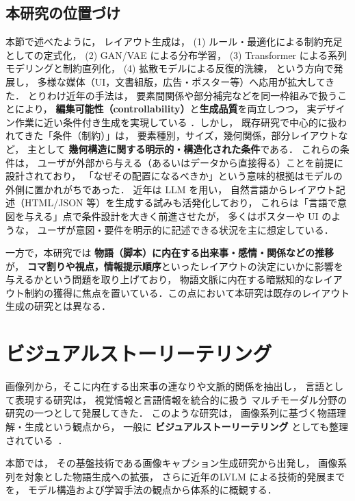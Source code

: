 \documentclass[a4j,12pt,dvipdfmx]{jsreport}
\begin{document}
\subsection{本研究の位置づけ}
\label{sec:layout_positioning}

本節で述べたように，
レイアウト生成は，
(1) ルール・最適化による制約充足としての定式化，
(2) GAN/VAE による分布学習，
(3) Transformer による系列モデリングと制約直列化，
(4) 拡散モデルによる反復的洗練，
という方向で発展し，
多様な媒体（UI，文書組版，広告・ポスター等）へ応用が拡大してきた．
とりわけ近年の手法は，
要素間関係や部分補完などを同一枠組みで扱うことにより，
\textbf{編集可能性（controllability）}と\textbf{生成品質}を両立しつつ，
実デザイン作業に近い条件付き生成を実現している
\cite{jiang_layoutformer_2023,inoue_layoutdm_2023,lin_layoutprompter_2023}．しかし，
既存研究で中心的に扱われてきた「条件（制約）」は，
要素種別，サイズ，幾何関係，部分レイアウトなど，
主として \textbf{幾何構造に関する明示的・構造化された条件}である．
これらの条件は，
ユーザが外部から与える（あるいはデータから直接得る）ことを前提に設計されており，
「なぜその配置になるべきか」という意味的根拠はモデルの外側に置かれがちであった．
近年は LLM を用い，
自然言語からレイアウト記述（HTML/JSON 等）を生成する試みも活発化しており，
これらは「言語で意図を与える」点で条件設計を大きく前進させたが，
多くはポスターや UI のような，
ユーザが意図・要件を明示的に記述できる状況を主に想定している．

一方で，本研究では
\textbf{物語（脚本）に内在する出来事・感情・関係などの推移}が，
\textbf{コマ割りや視点，情報提示順序}といったレイアウトの決定にいかに影響を与えるかという問題を取り上げており，
物語文脈に内在する暗黙知的なレイアウト制約の獲得に焦点を置いている．この点において本研究は既存のレイアウト生成の研究とは異なる．

\section{ビジュアルストーリーテリング}
\label{sec:visual_storytelling}

画像列から，そこに内在する出来事の連なりや文脈的関係を抽出し，
言語として表現する研究は，
視覚情報と言語情報を統合的に扱う
マルチモーダル分野の研究の一つとして発展してきた．
このような研究は，
画像系列に基づく物語理解・生成という観点から，
一般に
\textbf{ビジュアルストーリーテリング}
としても整理されている~\cite{huang-etal-2016-visual}．

本節では，
その基盤技術である画像キャプション生成研究から出発し，
画像系列を対象とした物語生成への拡張，
さらに近年のLVLM
による技術的発展までを，
モデル構造および学習手法の観点から体系的に概観する．
\end{document}
